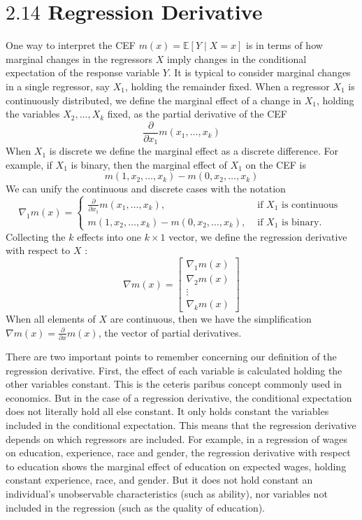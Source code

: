 \documentclass[10pt]{article}
\begin{document}
\section{$2.14$ Regression Derivative}
One way to interpret the CEF $m(x)=\mathbb{E}[Y \mid X=x]$ is in terms of how marginal changes in the regressors $X$ imply changes in the conditional expectation of the response variable $Y$. It is typical to consider marginal changes in a single regressor, say $X_{1}$, holding the remainder fixed. When a regressor $X_{1}$ is continuously distributed, we define the marginal effect of a change in $X_{1}$, holding the variables $X_{2}, \ldots, X_{k}$ fixed, as the partial derivative of the CEF
$$
\frac{\partial}{\partial x_{1}} m\left(x_{1}, \ldots, x_{k}\right)
$$
When $X_{1}$ is discrete we define the marginal effect as a discrete difference. For example, if $X_{1}$ is binary, then the marginal effect of $X_{1}$ on the CEF is
$$
m\left(1, x_{2}, \ldots, x_{k}\right)-m\left(0, x_{2}, \ldots, x_{k}\right)
$$
We can unify the continuous and discrete cases with the notation
$$
\nabla_{1} m(x)=\left\{\begin{array}{cc}
\frac{\partial}{\partial x_{1}} m\left(x_{1}, \ldots, x_{k}\right), & \text { if } X_{1} \text { is continuous } \\
m\left(1, x_{2}, \ldots, x_{k}\right)-m\left(0, x_{2}, \ldots, x_{k}\right), & \text { if } X_{1} \text { is binary. }
\end{array}\right.
$$
Collecting the $k$ effects into one $k \times 1$ vector, we define the regression derivative with respect to $X$ :
$$
\nabla m(x)=\left[\begin{array}{c}
\nabla_{1} m(x) \\
\nabla_{2} m(x) \\
\vdots \\
\nabla_{k} m(x)
\end{array}\right]
$$
When all elements of $X$ are continuous, then we have the simplification $\nabla m(x)=\frac{\partial}{\partial x} m(x)$, the vector of partial derivatives.

There are two important points to remember concerning our definition of the regression derivative. First, the effect of each variable is calculated holding the other variables constant. This is the ceteris paribus concept commonly used in economics. But in the case of a regression derivative, the conditional expectation does not literally hold all else constant. It only holds constant the variables included in the conditional expectation. This means that the regression derivative depends on which regressors are included. For example, in a regression of wages on education, experience, race and gender, the regression derivative with respect to education shows the marginal effect of education on expected wages, holding constant experience, race, and gender. But it does not hold constant an individual's unobservable characteristics (such as ability), nor variables not included in the regression (such as the quality of education).
\end{document}

